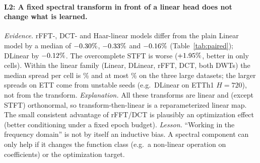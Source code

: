 \documentclass[11pt,a4paper]{article}
\newcommand{\lrn}[1]{\textbf{L#1}}
\begin{document}
\begin{table}[t]
\centering
\caption{Paired comparisons over cells (seed-mean MSE). $\Delta=\mathrm{MSE}_A/\mathrm{MSE}_B-1$; negative favors A. Channel-mixing rows exclude ETTh1, where the automatic rule disabled mixing and both variants are identical. $p$-values are descriptive: cells of the same dataset are correlated.}
\label{tab:paired}
\resizebox{\textwidth}{!}{}
\end{table}

\paragraph{\lrn{2}: A fixed spectral transform in front of a linear head does not change what is learned.}
\emph{Evidence.} rFFT-, DCT- and Haar-linear models differ from the plain Linear model by a median of $-0.30\%$, $-0.33\%$ and $-0.16\%$ (Table~\ref{tab:paired}); DLinear by $-0.12\%$. The overcomplete STFT is worse ($+1.95\%$, better in only \cmpSTFTLinvsLinearwins{} cells). Within the linear family (Linear, DLinear, rFFT, DCT, both DWTs) the median spread per cell is \linFamSpreadMed\% and at most \linFamSpreadBigData\% on the three large datasets; the larger spreads on ETT come from unstable seeds (e.g.\ DLinear on ETTh1 $H{=}720$), not from the transform.
\emph{Explanation.} All these transforms are linear and (except STFT) orthonormal, so transform-then-linear is a reparameterized linear map. The small consistent advantage of rFFT/DCT is plausibly an optimization effect (better conditioning under a fixed epoch budget).
\emph{Lesson.} ``Working in the frequency domain'' is not by itself an inductive bias. A spectral component can only help if it changes the function class (e.g.\ a non-linear operation on coefficients) or the optimization target.

\begin{table}[t]
\centering
\caption{Per-dataset effects (relative MSE change in \%, averaged over horizons; negative is better). Cycle queue: Cyc-Lin-CI vs.\ Linear. Weekly vs auto period: Cyc-Fixed vs.\ Cyc-Lin-CI (identical where the periods agree). MLP residual: Cyc-MLP-CI vs.\ Cyc-Lin-CI. Channel mixing: Cyc-MLP (auto mixing) vs.\ Cyc-MLP-CI. PatchTST: vs.\ Cyc-Lin-CI. $C$: channels; $p$: periods used.}
\label{tab:effects}
\resizebox{\columnwidth}{!}{}
\end{table}
\end{document}

